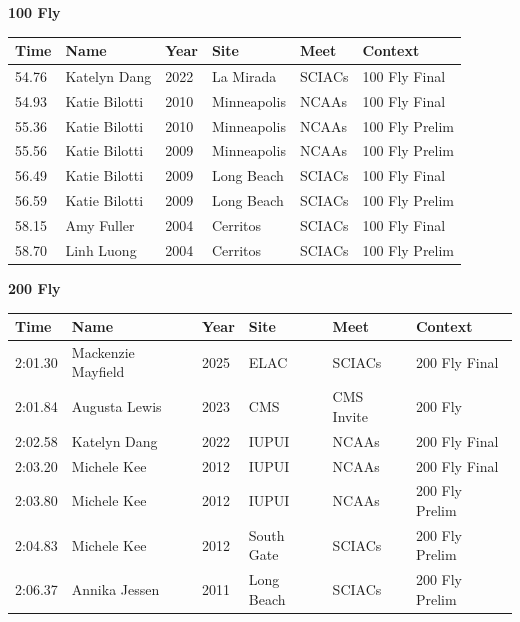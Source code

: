 \noindent\begin{minipage}[t]{0.98\textwidth}
\centering
\textbf{\textcolor{teamprimary}{100 Fly}}\par
\vspace{0.5em}
\centering
\small
\renewcommand{\arraystretch}{1.0}
\setlength{\tabcolsep}{4pt}
\begin{tabular}{@{}p{2.0cm}p{3.2cm}p{1.2cm}p{2.0cm}p{2.0cm}p{2.5cm}@{}}
\toprule
\textbf{Time} & \textbf{Name} & \textbf{Year} & \textbf{Site} & \textbf{Meet} & \textbf{Context} \\
\midrule
54.76 & Katelyn Dang & 2022 & La Mirada & SCIACs & 100 Fly Final \\
54.93 & Katie Bilotti & 2010 & Minneapolis & NCAAs & 100 Fly Final \\
55.36 & Katie Bilotti & 2010 & Minneapolis & NCAAs & 100 Fly Prelim \\
55.56 & Katie Bilotti & 2009 & Minneapolis & NCAAs & 100 Fly Prelim \\
56.49 & Katie Bilotti & 2009 & Long Beach & SCIACs & 100 Fly Final \\
56.59 & Katie Bilotti & 2009 & Long Beach & SCIACs & 100 Fly Prelim \\
58.15 & Amy Fuller & 2004 & Cerritos & SCIACs & 100 Fly Final \\
58.70 & Linh Luong & 2004 & Cerritos & SCIACs & 100 Fly Prelim \\
\bottomrule
\end{tabular}
\end{minipage}
\vspace{1.2em}
\noindent\begin{minipage}[t]{0.98\textwidth}
\centering
\textbf{\textcolor{teamprimary}{200 Fly}}\par
\vspace{0.5em}
\centering
\small
\renewcommand{\arraystretch}{1.0}
\setlength{\tabcolsep}{4pt}
\begin{tabular}{@{}p{2.0cm}p{3.2cm}p{1.2cm}p{2.0cm}p{2.0cm}p{2.5cm}@{}}
\toprule
\textbf{Time} & \textbf{Name} & \textbf{Year} & \textbf{Site} & \textbf{Meet} & \textbf{Context} \\
\midrule
2:01.30 & Mackenzie Mayfield & 2025 & ELAC & SCIACs & 200 Fly Final \\
2:01.84 & Augusta Lewis & 2023 & CMS & CMS Invite & 200 Fly \\
2:02.58 & Katelyn Dang & 2022 & IUPUI & NCAAs & 200 Fly Final \\
2:03.20 & Michele Kee & 2012 & IUPUI & NCAAs & 200 Fly Final \\
2:03.80 & Michele Kee & 2012 & IUPUI & NCAAs & 200 Fly Prelim \\
2:04.83 & Michele Kee & 2012 & South Gate & SCIACs & 200 Fly Prelim \\
2:06.37 & Annika Jessen & 2011 & Long Beach & SCIACs & 200 Fly Prelim \\
\bottomrule
\end{tabular}
\end{minipage}

